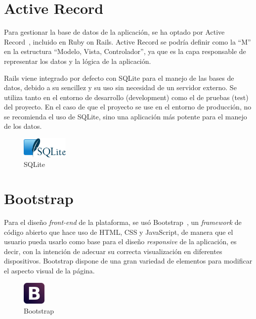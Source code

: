 
\section{Active Record}
\label{3:sec:2}

Para gestionar la base de datos de la aplicación, se ha optado por Active Record~\cite{Active}, incluido en Ruby on Rails. Active Record se podría definir como la ``M'' en la estructura ``Modelo, Vista, Controlador'', ya que es la capa responsable de representar los datos y la lógica de la aplicación.

Rails viene integrado por defecto con SQLite para el manejo de las bases de datos, debido a su sencillez y su uso sin necesidad de un servidor externo. Se utiliza tanto en el entorno de desarrollo (development) como el de pruebas (test) del proyecto. 
En el caso de que el proyecto se use en el entorno de producción, no se recomienda el uso de SQLite, sino una aplicación más potente para el manejo de los datos.

\begin{figure}[!th]
\begin{center}
\includegraphics[width=0.2\textwidth]{images/logo_sqlite.eps}
\caption{SQLite}
\label{fig:5}
\end{center}
\end{figure}


\section{Bootstrap}
\label{3:sec:3}

Para el diseño \textit{front-end} de la plataforma, se usó Bootstrap~\cite{Bootstrap}, un \textit{framework} de código abierto que hace uso de HTML, CSS y JavaScript, de manera que el usuario pueda usarlo como base para el diseño \textit{responsive} de la aplicación, es decir, con la intención de adecuar su correcta visualización en diferentes dispositivos. Bootstrap dispone de una gran variedad de elementos para modificar el aspecto visual
de la página.

\begin{figure}[!th]
\begin{center}
\includegraphics[width=0.1\textwidth]{images/logo_bootstrap.eps}
\caption{Bootstrap}
\label{fig:6}
\end{center}
\end{figure}

